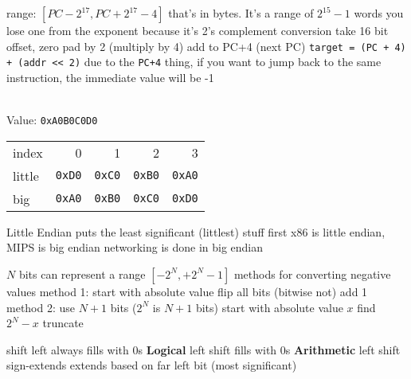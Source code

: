 \documentclass[12pt]{article}
\begin{document}
\begin{spacing}{0.8}
\begin{multicols*}{2}
\begin{flushleft}
\begin{outline}[longenum]
  \1 range: $[ PC - 2^{17}, PC + 2^{17} - 4 ]$
    \2 that's in bytes. It's a range of $2^{15}-1$ words
    \2 you lose one from the exponent because it's 2's complement
  \1 conversion
    \2 take 16 bit offset, zero pad by 2 (multiply by 4)
    \2 add to PC+4 (next PC)
  \1 \verb|target = (PC + 4) + (addr << 2)|
  \1 due to the \verb|PC+4| thing, if you want to jump back to the same instruction, the immediate value will be -1

\\
Value: \verb|0xA0B0C0D0|\\
  \1 
  \begin{tabular}{l r r r r}
  index  & 0 & 1 & 2 & 3 \\
  little & \verb|0xD0| & \verb|0xC0| & \verb|0xB0| & \verb|0xA0| \\
  big    & \verb|0xA0| & \verb|0xB0| & \verb|0xC0| & \verb|0xD0| \\
  \end{tabular}
    \2 Little Endian puts the least significant (littlest) stuff first
  \1 x86 is little endian, MIPS is big endian
  \1 networking is done in big endian

  \1 $N$ bits can represent a range $[ -2^N, +2^N - 1 ]$
  \1 methods for converting negative values
  \1 method 1:
    \2 start with absolute value
    \2 flip all bits (bitwise not)
    \2 add 1
  \1 method 2:
    \2 use $N+1$ bits ($2^N$ is $N+1$ bits)
    \2 start with absolute value $x$
    \2 find $2^N - x$
    \2 truncate

  \1 shift left always fills with 0s
  \1 \textbf{Logical} left shift fills with 0s
  \1 \textbf{Arithmetic} left shift sign-extends
    \2 extends based on far left bit (most significant)
 

\end{outline}
\end{flushleft}
\end{multicols*}
\end{spacing}
\end{document}
